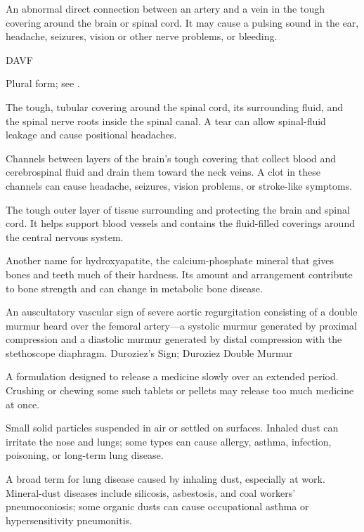  An abnormal direct connection between an artery and a vein in the tough covering around the brain or spinal cord. It may cause a pulsing sound in the ear, headache, seizures, vision or other nerve problems, or bleeding.

\synonyms
DAVF

 Plural form; see .


 The tough, tubular covering around the spinal cord, its surrounding fluid, and the spinal nerve roots inside the spinal canal. A tear can allow spinal-fluid leakage and cause positional headaches.

 Channels between layers of the brain’s tough covering that collect blood and cerebrospinal fluid and drain them toward the neck veins. A clot in these channels can cause headache, seizures, vision problems, or stroke-like symptoms.

 The tough outer layer of tissue surrounding and protecting the brain and spinal cord. It helps support blood vessels and contains the fluid-filled coverings around the central nervous system.

 Another name for hydroxyapatite, the calcium-phosphate mineral that gives bones and teeth much of their hardness. Its amount and arrangement contribute to bone strength and can change in metabolic bone disease.

 An auscultatory vascular sign of severe aortic regurgitation consisting of a double murmur heard over the femoral artery—a systolic murmur generated by proximal compression and a diastolic murmur generated by distal compression with the stethoscope diaphragm.
\synonyms
Duroziez's Sign; Duroziez Double Murmur

 A formulation designed to release a medicine slowly over an extended period. Crushing or chewing some such tablets or pellets may release too much medicine at once.

 Small solid particles suspended in air or settled on surfaces. Inhaled dust can irritate the nose and lungs; some types can cause allergy, asthma, infection, poisoning, or long-term lung disease.

 A broad term for lung disease caused by inhaling dust, especially at work. Mineral-dust diseases include silicosis, asbestosis, and coal workers' pneumoconiosis; some organic dusts can cause occupational asthma or hypersensitivity pneumonitis.

